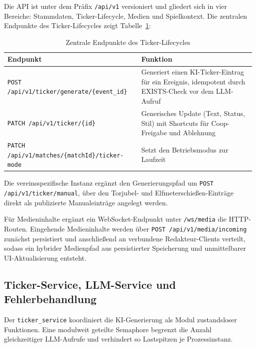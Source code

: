 Die API ist unter dem Präfix \texttt{/api/v1} versioniert und gliedert sich in vier Bereiche: Stammdaten, Ticker-Lifecycle, Medien und Spielkontext. Die zentralen Endpunkte des Ticker-Lifecycles zeigt Tabelle~\ref{tab:api-endpoints}:

{\small\begin{longtable}[]{@{}
  >{\raggedright\arraybackslash}p{}
  >{\raggedright\arraybackslash}p{}@{}}
\caption{Zentrale Endpunkte des Ticker-Lifecycles}\label{tab:api-endpoints}\\
\toprule\noalign{}
Endpunkt & Funktion \\
\midrule\noalign{}
\endhead
\bottomrule\noalign{}
\endlastfoot
\texttt{POST /api/v1/ticker/generate/\{event\_id\}} & Generiert einen KI-Ticker-Eintrag für ein Ereignis, idempotent durch EXISTS-Check vor dem LLM-Aufruf \\
\texttt{PATCH /api/v1/ticker/\{id\}} & Generisches Update (Text, Status, Stil) mit Shortcuts für Coop-Freigabe und Ablehnung \\
\texttt{PATCH /api/v1/matches/\{matchId\}/ticker-mode} & Setzt den Betriebsmodus zur Laufzeit \\
\end{longtable}}

Die vereinsspezifische Instanz ergänzt den Generierungspfad um \texttt{POST /api/v1/ticker/manual}, über den Torjubel- und Elfmeterschießen-Einträge direkt als publizierte Manualeinträge angelegt werden.

Für Medieninhalte ergänzt ein WebSocket-Endpunkt unter \texttt{/ws/media} die HTTP-Routen. Eingehende Medieninhalte werden über \texttt{POST /api/v1/media/incoming} zunächst persistiert und anschließend an verbundene Redakteur-Clients verteilt, sodass ein hybrider Medienpfad aus persistierter Speicherung und unmittelbarer UI-Aktualisierung entsteht.


\subsection{Ticker-Service, LLM-Service und Fehlerbehandlung}\label{ticker-service-domuxe4nenlogik}\label{llm-service-prompt-aufbau-und-provider-dispatch}

Der \texttt{ticker\_service} koordiniert die KI-Generierung als Modul zustandsloser Funktionen. Eine modulweit geteilte Semaphore begrenzt die Anzahl gleichzeitiger LLM-Aufrufe und verhindert so Lastspitzen je Prozessinstanz.

